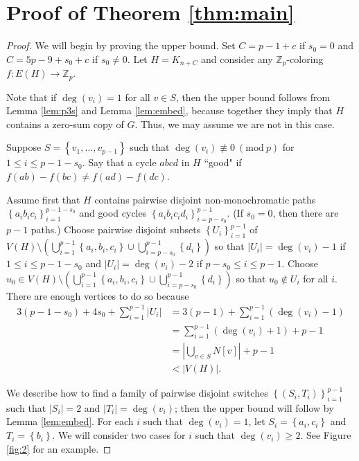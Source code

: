 \documentclass[11pt]{article}
\newcommand{\bZ}{\mathbb{Z}}
\newcommand\set[1]{\left\{ #1 \right\}}
\newcommand\abs[1]{\left\lvert #1 \right\rvert}
\newcommand\pars[1]{\left( #1 \right)}
\newcommand\mmod[1]{\ (\mathrm{mod}\ #1)}
\theoremstyle{definition}
\theoremstyle{plain}
\begin{document}
\section{Proof of Theorem \ref{thm:main}}
\begin{proof}
    We will begin by proving the upper bound.  Set $C=p-1+c$ if $s_0=0$ and $C=5p-9+s_0+c$ if $s_0\neq 0$. Let $H=K_{n+C}$ and consider any $\bZ_p$-coloring $f:E(H)\to \bZ_p$. 

    Note that if $\deg(v_i)=1$ for all $v\in S$, then the upper bound follows from Lemma \ref{lem:p3s} and Lemma \ref{lem:embed}, because together they imply that $H$ contains a zero-sum copy of $G$. Thus, we may assume we are not in this case.
    
    Suppose $S=\set{v_1,\ldots,v_{p-1}}$ such that $\deg(v_i)\not\equiv 0\mmod{p}$ for $1\leq i\leq p-1-s_0$. Say that a cycle $abcd$ in $H$ ``good" if $f(ab)-f(bc)\neq f(ad)-f(dc)$. 
    
    Assume first that $H$ contains pairwise disjoint non-monochromatic paths $\set{a_ib_ic_i}_{i=1}^{p-1-s_0}$ and good cycles $\set{a_ib_ic_id_i}_{i=p-s_0}^{p-1}$. (If $s_0=0$, then there are $p-1$ paths.) Choose pairwise disjoint subsets $\set{U_i}_{i=1}^{p-1}$ of $V(H)\setminus\pars{\bigcup_{i=1}^{p-1}\set{a_i,b_i,c_i}\cup\bigcup_{i=p-s_0}^{p-1}\set{d_i}}$ so that $\abs{U_i}=\deg(v_i)-1$ if $1\leq i\leq p-1-s_0$ and $\abs{U_i}=\deg(v_i)-2$ if $p-s_0\leq i\leq p-1$. Choose $u_0\in V(H)\setminus\pars{\bigcup_{i=1}^{p-1}\set{a_i,b_i,c_i}\cup\bigcup_{i=p-s_0}^{p-1}\set{d_i}}$ so that $u_0\notin U_i$ for all $i$. There are enough vertices to do so because
    \begin{align*}
        3(p-1-s_0)+4s_0+\sum_{i=1}^{p-1}\abs{U_i} &= 3(p-1)+\sum_{i=1}^{p-1}(\deg(v_i)-1)\\
        &=\sum_{i=1}^{p-1}(\deg(v_i)+1)+p-1\\
        &= \abs{\bigcup_{v\in S}N[v]}+p-1\\
        &< \abs{V(H)}.
    \end{align*}
    
    We describe how to find a family of pairwise disjoint switches $\set{(S_i,T_i)}_{i=1}^{p-1}$ such that $\abs{S_i}=2$ and $\abs{T_i}=\deg(v_i)$; then the upper bound will follow by Lemma \ref{lem:embed}. For each $i$ such that $\deg(v_i)=1$, let $S_i=\set{a_i,c_i}$ and $T_i=\set{b_i}$. We will consider two cases for $i$ such that $\deg(v_i)\geq 2$. See Figure \ref{fig:2} for an example.
    

\end{proof}
\end{document}
